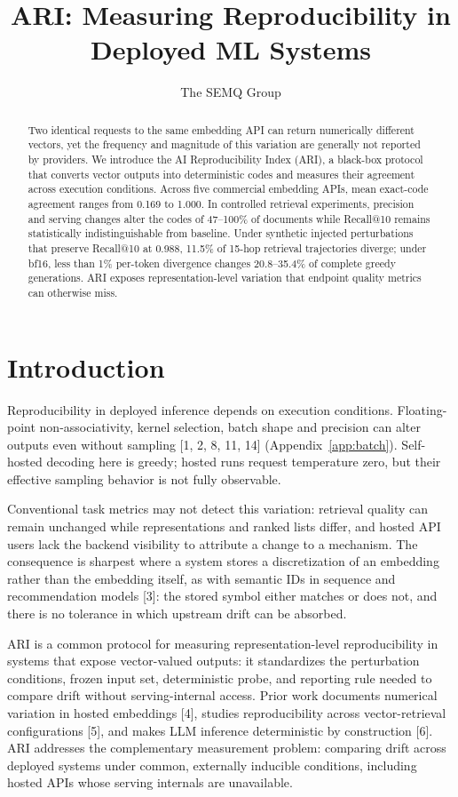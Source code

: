 \documentclass{article}
\title{ARI: Measuring Reproducibility in Deployed ML Systems}
\author{%
  The SEMQ Group \\
}
\begin{document}
\maketitle

\begin{abstract}
Two identical requests to the same embedding API can return numerically different vectors, yet the frequency and magnitude of this variation are generally not reported by providers. We introduce the AI Reproducibility Index (ARI), a black-box protocol that converts vector outputs into deterministic codes and measures their agreement across execution conditions. Across five commercial embedding APIs, mean exact-code agreement ranges from 0.169 to 1.000. In controlled retrieval experiments, precision and serving changes alter the codes of 47–100\% of documents while Recall@10 remains statistically indistinguishable from baseline. Under synthetic injected perturbations that preserve Recall@10 at 0.988, 11.5\% of 15-hop retrieval trajectories diverge; under bf16, less than 1\% per-token divergence changes 20.8–35.4\% of complete greedy generations. ARI exposes representation-level variation that endpoint quality metrics can otherwise miss.


\end{abstract}

\section{Introduction}\label{sec1}

Reproducibility in deployed inference depends on execution conditions. Floating-point non-associativity, kernel selection, batch shape and precision can alter outputs even without sampling [1, 2, 8, 11, 14] (Appendix~\ref{app:batch}). Self-hosted decoding here is greedy; hosted runs request temperature zero, but their effective sampling behavior is not fully observable.

Conventional task metrics may not detect this variation: retrieval quality can remain unchanged while representations and ranked lists differ, and hosted API users lack the backend visibility to attribute a change to a mechanism. The consequence is sharpest where a system stores a discretization of an embedding rather than the embedding itself, as with semantic IDs in sequence and recommendation models [3]: the stored symbol either matches or does not, and there is no tolerance in which upstream drift can be absorbed.

ARI is a common protocol for measuring representation-level reproducibility in systems that expose vector-valued outputs: it standardizes the perturbation conditions, frozen input set, deterministic probe, and reporting rule needed to compare drift without serving-internal access. Prior work documents numerical variation in hosted embeddings [4], studies reproducibility across vector-retrieval configurations [5], and makes LLM inference deterministic by construction [6]. ARI addresses the complementary measurement problem: comparing drift across deployed systems under common, externally inducible conditions, including hosted APIs whose serving internals are unavailable.
\end{document}
